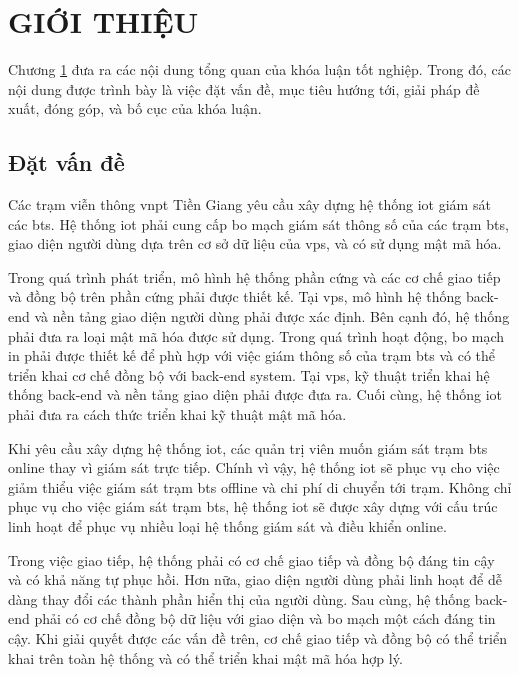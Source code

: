 \chapter{GIỚI THIỆU}
\label{Chapter1}

Chương \ref{Chapter1} đưa ra các nội dung tổng quan của khóa luận tốt nghiệp. Trong đó, các nội dung được trình bày là việc đặt vấn đề, mục tiêu hướng tới, giải pháp đề xuất, đóng góp, và bố cục của khóa luận.

\section{Đặt vấn đề}

Các trạm viễn thông \acrfull{vnpt} Tiền Giang yêu cầu xây dựng hệ thống \acrfull{iot} giám sát các \acrfull{bts}. Hệ thống \acrshort{iot} phải cung cấp bo mạch giám sát thông số của các trạm \acrshort{bts}, giao diện người dùng dựa trên cơ sở dữ liệu của \acrfull{vps}, và có sử dụng mật mã hóa.

Trong quá trình phát triển, mô hình hệ thống phần cứng và các cơ chế giao tiếp và đồng bộ trên phần cứng phải được thiết kế. Tại \acrshort{vps}, mô hình hệ thống back-end và nền tảng giao diện người dùng phải được xác định. Bên cạnh đó, hệ thống phải đưa ra loại mật mã hóa được sử dụng. Trong quá trình hoạt động, bo mạch in phải được thiết kế để phù hợp với việc giám thông số của trạm \acrshort{bts} và có thể triển khai cơ chế đồng bộ với back-end system. Tại \acrshort{vps}, kỹ thuật triển khai hệ thống back-end và nền tảng giao diện phải được đưa ra. Cuối cùng, hệ thống \acrshort{iot} phải đưa ra cách thức triển khai kỹ thuật mật mã hóa.

Khi yêu cầu xây dựng hệ thống \acrshort{iot}, các quản trị viên muốn giám sát trạm \acrshort{bts} online thay vì giám sát trực tiếp. Chính vì vậy, hệ thống \acrshort{iot} sẽ phục vụ cho việc giảm thiểu việc giám sát trạm \acrshort{bts} offline và chi phí di chuyển tới trạm. 
Không chỉ phục vụ cho việc giám sát trạm \acrshort{bts}, hệ thống \acrshort{iot} sẽ được xây dựng với cấu trúc linh hoạt để phục vụ nhiều loại hệ thống giám sát và điều khiển online.

Trong việc giao tiếp, hệ thống phải có cơ chế giao tiếp và đồng bộ đáng tin cậy và có khả năng tự phục hồi. Hơn nữa, giao diện người dùng phải linh hoạt để dễ dàng thay đổi các thành phần hiển thị của người dùng. Sau cùng, hệ thống back-end phải có cơ chế đồng bộ dữ liệu với giao diện và bo mạch một cách đáng tin cậy. Khi giải quyết được các vấn đề trên, cơ chế giao tiếp và đồng bộ có thể triển khai trên toàn hệ thống và có thể triển khai mật mã hóa hợp lý.

